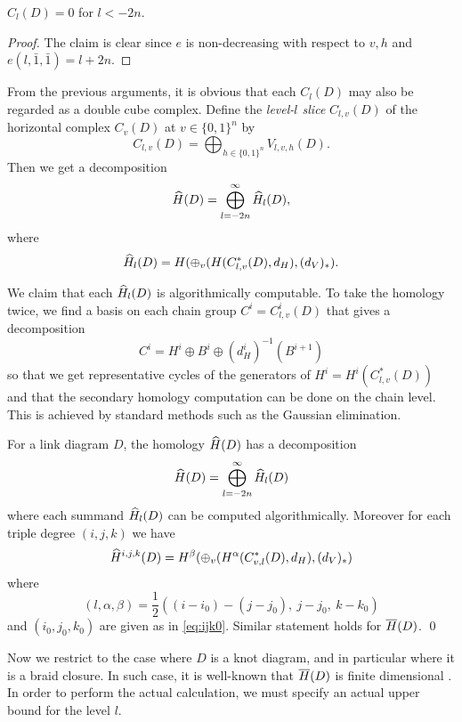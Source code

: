 \begin{lemma}
    $C_l(D) = 0$ for $l < -2n$.
\end{lemma}

\begin{proof}
    The claim is clear since $e$ is non-decreasing with respect to $v, h$ and $e(l, \bar{1}, \bar{1}) = l + 2n$.
\end{proof}

From the previous arguments, it is obvious that each $C_l(D)$ may also be regarded as a double cube complex. Define the \textit{level-$l$ slice} $C_{l, v}(D)$ of the horizontal complex $C_v(D)$ at $v \in \{0, 1\}^n$ by
\[
    C_{l, v}(D) = \bigoplus_{h \in \{0, 1\}^n} V_{l, v, h}(D).
\]
Then we get a decomposition
\[
    \widehat{H}(D) = \bigoplus_{l = -2n}^\infty \widehat{H}_l(D),
\]
where 
\[
    \widehat{H}_l(D) = H(\oplus_v (H(C^*_{l, v}(D), d_H), (d_V)_*).
\]

We claim that each $\widehat{H}_l(D)$ is algorithmically computable. To take the homology twice, we find a basis on each chain group $C^i = C^i_{l, v}(D)$ that gives a decomposition
\[
    C^i = H^i \oplus B^i \oplus (d^i_H)^{-1}(B^{i + 1})
\]
so that we get representative cycles of the generators of $H^i = H^i(C^*_{l, v}(D))$ and that the secondary homology computation can be done on the chain level. This is achieved by standard methods such as the Gaussian elimination. 

\begin{proposition}
    For a link diagram $D$, the homology $\widehat{H}(D)$ has a decomposition
    \[
        \widehat{H}(D) = \bigoplus_{l = -2n}^{\infty} \widehat{H}_l(D)
    \]
    where each summand $\widehat{H}_l(D)$ can be computed algorithmically. Moreover for each triple degree $(i, j, k)$ we have 
    \begin{equation} \label{eq:Hijk}
        \widehat{H}^{i, j, k}(D) = H^\beta(\oplus_v (H^\alpha(C^*_{v, l}(D), d_H), (d_V)_*)
    \end{equation}
    where
    \[
        (l, \alpha, \beta) = \frac{1}{2}((i - i_0) - (j - j_0),\ j - j_0,\ k - k_0)
    \]
    and $(i_0, j_0, k_0)$ are given as in \eqref{eq:ijk0}. Similar statement holds for $\overline{H}(D)$. \qed
\end{proposition}

Now we restrict to the case where $D$ is a knot diagram, and in particular where it is a braid closure. In such case, it is well-known that $\overline{H}(D)$ is finite dimensional \cite{Ras15}. In order to perform the actual calculation, we must specify an actual upper bound for the level $l$.

